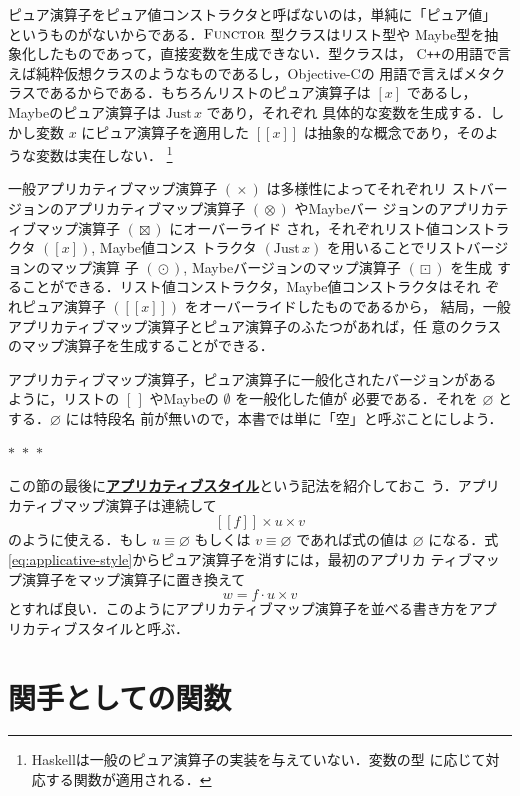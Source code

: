 \documentclass[a5paper,twoside,fleqn,draft]{jsbook}
\def\[{[\![}
\def\]{]\!]}
\newcommand{\separator}{\begin{center}$*$~$*$~$*$\end{center}}
\newcommand{\programminglanguage}[1]{\textsf{#1}}
\newcommand{\cxx}{\programminglanguage{C}\texttt{++}}
\newcommand{\haskell}{\programminglanguage{Haskell}}
\newcommand{\objectivec}{\programminglanguage{Objective-C}}
\newcommand{\keyword}[1]{{\underline{\textbf{#1}}}}
\newcommand{\mEmptyList}{{[\,]}}
\newcommand{\mNothing}{\emptyset}
\newcommand{\mPureNothing}{\varnothing}
\DeclareMathOperator{\mAppMap}{\times}
\DeclareMathOperator{\mAppMapList}{\otimes}
\DeclareMathOperator{\mAppMapMaybe}{\boxtimes}
\DeclareMathOperator{\mMap}{\cdot}
\DeclareMathOperator{\mMapList}{\odot}
\DeclareMathOperator{\mMapMaybe}{\boxdot}
\newcommand{\mValueConstructor}[1]{\mathrm{#1}}
\newcommand{\mValueWith}[2]{\mValueConstructor{#1}\,#2}
\newcommand{\mJustWith}[1]{\mValueWith{Just}{#1}}
\newcommand{\mPureWith}[1]{\[#1\]}
\newcommand{\mTypeClass}[1]{\textsc{#1}} %
\newcommand{\mFunctorTypeClass}{\mTypeClass{Functor}}
\begin{document}
ピュア演算子をピュア値コンストラクタと呼ばないのは，単純に「ピュア値」
というものがないからである．$\mFunctorTypeClass$ 型クラスはリスト型や
Maybe型を抽象化したものであって，直接変数を生成できない．型クラスは，
\cxx の用語で言えば純粋仮想クラスのようなものであるし，\objectivec の
用語で言えばメタクラスであるからである．もちろんリストのピュア演算子は
$[x]$ であるし，Maybeのピュア演算子は $\mJustWith{x}$ であり，それぞれ
具体的な変数を生成する．しかし変数 $x$ にピュア演算子を適用した
$\mPureWith{x}$ は抽象的な概念であり，そのような変数は実在しない．
\footnote{\haskell は一般のピュア演算子の実装を与えていない．変数の型
  に応じて対応する関数が適用される．}

一般アプリカティブマップ演算子 $(\mAppMap)$ は多様性によってそれぞれリ
ストバージョンのアプリカティブマップ演算子 $(\mAppMapList)$ やMaybeバー
ジョンのアプリカティブマップ演算子 $(\mAppMapMaybe)$ にオーバーライド
され，それぞれリスト値コンストラクタ $([x])$, Maybe値コンス
トラクタ $(\mJustWith{x})$ を用いることでリストバージョンのマップ演算
子 $(\mMapList)$, Maybeバージョンのマップ演算子 $(\mMapMaybe)$ を生成
することができる．リスト値コンストラクタ，Maybe値コンストラクタはそれ
ぞれピュア演算子 $(\mPureWith{x})$ をオーバーライドしたものであるから，
結局，一般アプリカティブマップ演算子とピュア演算子のふたつがあれば，任
意のクラスのマップ演算子を生成することができる．

アプリカティブマップ演算子，ピュア演算子に一般化されたバージョンがある
ように，リストの $\mEmptyList$ やMaybeの $\mNothing$ を一般化した値が
必要である．それを $\mPureNothing$ とする．$\mPureNothing$ には特段名
前が無いので，本書では単に「空」と呼ぶことにしよう．

\separator

この節の最後に\keyword{アプリカティブスタイル}という記法を紹介しておこ
う．アプリカティブマップ演算子は連続して
\begin{equation}
  \label{eq:applicative-style}
  \mPureWith{f}\mAppMap u\mAppMap v
\end{equation}
のように使える．もし $u\equiv\mPureNothing$ もしくは
$v\equiv\mPureNothing$ であれば式の値は $\mPureNothing$ になる．式
\eqref{eq:applicative-style}からピュア演算子を消すには，最初のアプリカ
ティブマップ演算子をマップ演算子に置き換えて
\begin{equation}
  w
  =f\mMap u\mAppMap v
\end{equation}
とすれば良い．このようにアプリカティブマップ演算子を並べる書き方をアプ
リカティブスタイルと呼ぶ．

\section{関手としての関数}
\end{document}
